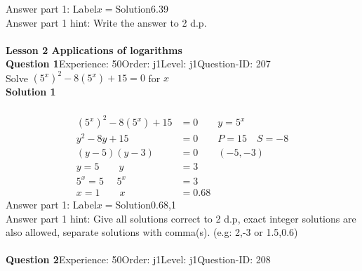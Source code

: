 \documentclass{article}
\begin{document}
Answer part 1: \hspace{10pt}Label\hspace{10pt}$x=$\hspace{10pt}Solution\hspace{10pt}6.39\\
Answer part 1 hint: \hspace{15pt}Write the answer to 2 d.p.\\
\\[4pt]
\noindent\large{\textbf{Lesson 2 Applications of logarithms}}\\[12pt]
\noindent\textbf{Question 1}\hspace{20pt}Experience: 50\hspace{20pt}Order: j1\hspace{20pt}Level: j1\hspace{20pt}Question-ID: 207\\[2pt]
Solve $(5^x)^2-8(5^x)+15=0$ for $x$\\[4pt]
\noindent\textbf{Solution 1}\\[2pt]
\\[-35pt]\begin{align*}
(5^x)^2-8(5^x)+15&=0\qquad y=5^x\\[2pt]
y^2-8y+15&=0\qquad P=15 \quad S=-8\\[2pt]
(y-5)(y-3)&=0\qquad (-5,-3)\\[2pt]
y=5 \qquad y&=3\\[2pt]
5^x=5\hspace{16pt} 5^x&=3\\[2pt]
x=1 \qquad x&=0.68
\end{align*}
Answer part 1: \hspace{10pt}Label\hspace{10pt}$x=$\hspace{10pt}Solution\hspace{10pt}0.68,1\\
Answer part 1 hint: \hspace{15pt} Give all solutions correct to 2 d.p, exact integer solutions are also allowed, separate solutions with comma(s). (e.g: 2,-3 or 1.5,0.6)\\
\\[4pt]
\noindent\textbf{Question 2}\hspace{20pt}Experience: 50\hspace{20pt}Order: j1\hspace{20pt}Level: j1\hspace{20pt}Question-ID: 208\\[2pt]
\end{document}
